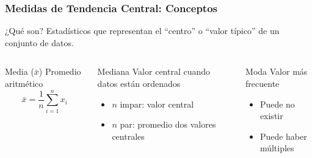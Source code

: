\documentclass[aspectratio=169,11pt]{beamer}
\begin{document}
\begin{frame}[fragile]
\frametitle{Medidas de Tendencia Central: Conceptos}

\begin{exampleblock}{¿Qué son?}
  Estadísticos que representan el ``centro'' o ``valor típico'' de un conjunto de datos.
\end{exampleblock}

\pause

\begin{columns}[T]
  \begin{block}{Media ($\bar{x}$)}
    Promedio aritmético
    $$\bar{x} = \frac{1}{n}\sum_{i=1}^{n} x_i$$
  \end{block}

  \begin{block}{Mediana}
    Valor central cuando datos están ordenados
    \begin{itemize}
      \item $n$ impar: valor central
      \item $n$ par: promedio dos valores centrales
    \end{itemize}
  \end{block}

  \begin{block}{Moda}
    Valor más frecuente
    \begin{itemize}
      \item Puede no existir
      \item Puede haber múltiples
    \end{itemize}
  \end{block}
\end{columns}
\end{frame}
\end{document}

